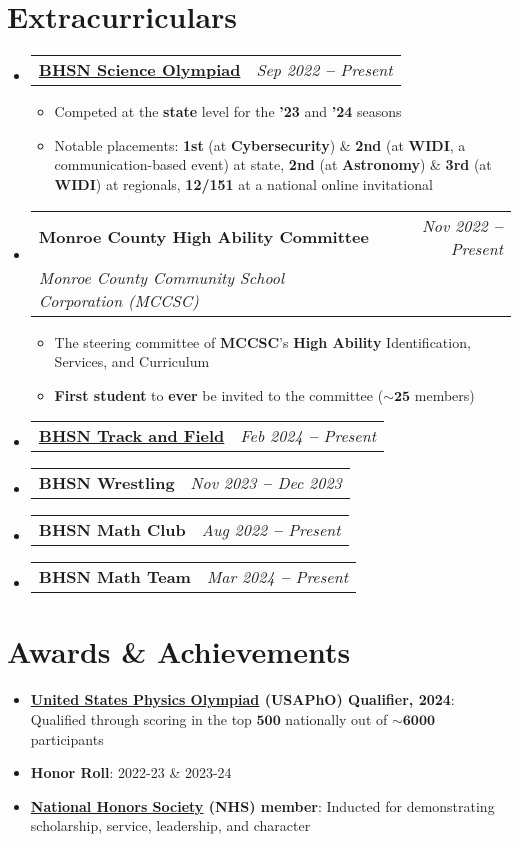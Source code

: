 \documentclass[letterpaper,9pt]{article}
\makeatletter
\newcommand{\cvSubItem}[1]{
  \item\small{
    {#1 \vspace{-2pt}}
  }
}
\newcommand{\cvThree}[3]{
  \vspace{-2pt}\item
    \begin{tabular*}{1\textwidth}[t]{l@{\extracolsep{\fill}}r}
      \textbf{#1} & \textit{\small #2} \\
      \textit{\small #3} \\
    \end{tabular*}\vspace{-5pt}
}
\newcommand{\cvTwo}[2]{
  \vspace{-2pt}\item
    \begin{tabular*}{1\textwidth}[t]{l@{\extracolsep{\fill}}r}
      \textbf{#1} & \textit{\small #2} \\
    \end{tabular*}\vspace{-5pt}
}
\newcommand{\cvItem}[1]{
  \item{
    #1
  }
  \vspace{-5pt}
}
\newcommand{\cvBodyStart}{\begin{itemize}[leftmargin=0.15in, label={}]}
\newcommand{\cvBodyEnd}{\end{itemize}}
\newcommand{\cvListStart}{\begin{itemize}}
\newcommand{\cvListEnd}{\end{itemize}\vspace{-5pt}}
\newcommand{\cvRegListStart}{\begin{itemize}[leftmargin=0.22in, label={}]}
\newcommand{\cvRegListEnd}{\end{itemize}}
\makeatother
\begin{document}
\section{Extracurriculars}
\cvBodyStart
    \cvTwo{\href{https://pbossev.pages.dev/extracurriculars/scioly/}{BHSN Science Olympiad}}{Sep 2022 \textbf{--} Present}
        \cvListStart
            \cvSubItem{Competed at the \textbf{state} level for the \textbf{'23} and \textbf{'24} seasons}
            \cvSubItem{Notable placements: \textbf{1st} (at \textbf{Cybersecurity}) \& \textbf{2nd} (at \textbf{WIDI}, a communication-based event) at state, \textbf{2nd} (at 
            \textbf{Astronomy}) \& \textbf{3rd} (at \textbf{WIDI}) at regionals, \textbf{12/151} at a national online invitational}
        \cvListEnd
    \cvThree{Monroe County High Ability Committee}{Nov 2022 \textbf{--} Present}{Monroe County Community School Corporation (MCCSC)}
        \cvListStart
            \cvSubItem{The steering committee of \textbf{MCCSC}'s \textbf{High Ability} Identification, Services, and Curriculum}
            \cvSubItem{\textbf{First student} to \textbf{ever} be invited to the committee ($\mathbf{\sim25}$ members)}
        \cvListEnd
    \cvTwo{\href{https://pbossev.pages.dev/extracurriculars/field/}{BHSN Track and Field}}{Feb 2024 \textbf{--} Present}
    \vspace{-10pt}
    \cvTwo{BHSN Wrestling}{Nov 2023 \textbf{--} Dec 2023}
    \vspace{-10pt}
    \cvTwo{BHSN Math Club}{Aug 2022 \textbf{--} Present}
    \vspace{-10pt}
    \cvTwo{BHSN Math Team}{Mar 2024 \textbf{--} Present}
    \vspace{-10pt}
\cvBodyEnd

\section{Awards \& Achievements}
\cvRegListStart
    \cvItem{\textbf{\href{https://www.aapt.org/physicsteam/PT-landing.cfm}{United States Physics Olympiad} (USAPhO) Qualifier, 2024}: Qualified through scoring in the top $\mathbf{500}$ nationally out of $\mathbf{\sim6000}$ participants}
    \cvItem{\textbf{Honor Roll}: 2022-23 \& 2023-24}
    \cvItem{\textbf{\href{https://www.nationalhonorsociety.org/}{National Honors Society} (NHS) member}: Inducted for demonstrating scholarship, service, leadership, and character}
    \vspace{-10pt}
\cvRegListEnd
\end{document}
